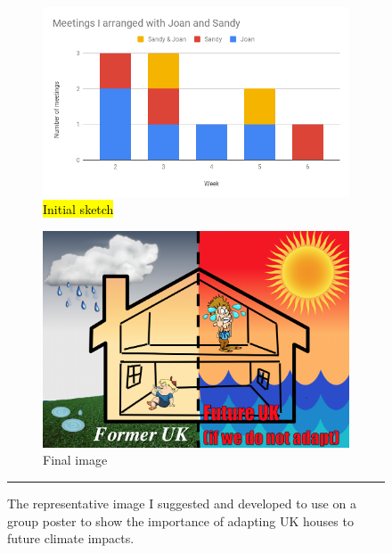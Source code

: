 \begin{figure}[htbp]
    \centering
        \begin{subfigure}{.48\textwidth}
          \centering
          \includegraphics[width=\textwidth]{figures/J+S_Meetings.png}
          \caption{\hl{Initial sketch}}
          \label{fig:Sketch01}
        \end{subfigure}
        \begin{subfigure}{.485\textwidth}
          \centering
          \includegraphics[width=\textwidth]{figures/eposter_sketch_2.png}
          \caption{Final image}
          \label{fig:Sketch02}
        \end{subfigure}
    \rule{\textwidth}{0.5pt} %
    \caption[\CCSA poster image.]{The representative image I suggested and developed to use on a group poster to show the importance of adapting UK houses to future climate impacts.}
    \label{fig:Sketch}
\end{figure}